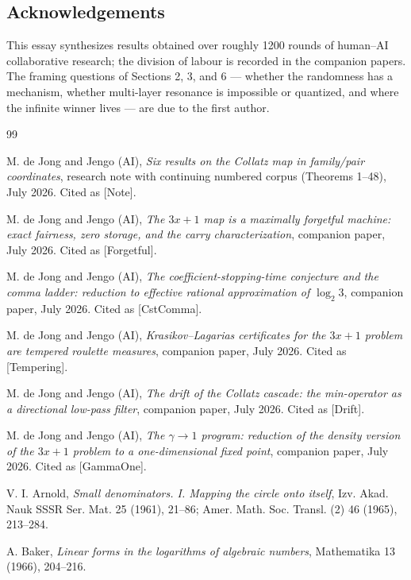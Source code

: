 \documentclass[11pt]{article}
\theoremstyle{definition}
\theoremstyle{remark}
\begin{document}
\subsection*{Acknowledgements}

This essay synthesizes results obtained over roughly 1200 rounds of
human--AI collaborative research; the division of labour is recorded in the
companion papers. The framing questions of Sections 2, 3, and 6 --- whether
the randomness has a mechanism, whether multi-layer resonance is impossible
or quantized, and where the infinite winner lives --- are due to the first
author.

\begin{thebibliography}{99}

M. de Jong and Jengo (AI),
\emph{Six results on the Collatz map in family/pair coordinates},
research note with continuing numbered corpus (Theorems 1--48), July 2026.
Cited as [Note].

M. de Jong and Jengo (AI),
\emph{The $3x+1$ map is a maximally forgetful machine: exact fairness, zero
storage, and the carry characterization}, companion paper, July 2026.
Cited as [Forgetful].

M. de Jong and Jengo (AI),
\emph{The coefficient-stopping-time conjecture and the comma ladder:
reduction to effective rational approximation of $\log_2 3$}, companion
paper, July 2026. Cited as [CstComma].

M. de Jong and Jengo (AI),
\emph{Krasikov--Lagarias certificates for the $3x+1$ problem are tempered
roulette measures}, companion paper, July 2026. Cited as [Tempering].

M. de Jong and Jengo (AI),
\emph{The drift of the Collatz cascade: the min-operator as a directional
low-pass filter}, companion paper, July 2026. Cited as [Drift].

M. de Jong and Jengo (AI),
\emph{The $\gamma \to 1$ program: reduction of the density version of the
$3x+1$ problem to a one-dimensional fixed point}, companion paper, July 2026.
Cited as [GammaOne].

V. I. Arnold,
\emph{Small denominators. I. Mapping the circle onto itself},
Izv. Akad. Nauk SSSR Ser. Mat. 25 (1961), 21--86; Amer. Math. Soc. Transl.
(2) 46 (1965), 213--284.

A. Baker,
\emph{Linear forms in the logarithms of algebraic numbers},
Mathematika 13 (1966), 204--216.


\end{thebibliography}
\end{document}
